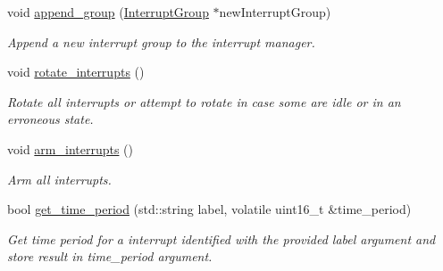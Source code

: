 \begin{DoxyCompactItemize}
\item 
void \hyperlink{classSPMB_1_1InterruptManager_a7848e944d851bf3bcc251e03e673433c}{append\+\_\+group} (\hyperlink{classSPMB_1_1InterruptGroup}{Interrupt\+Group} $\ast$new\+Interrupt\+Group)\hypertarget{classSPMB_1_1InterruptManager_a7848e944d851bf3bcc251e03e673433c}{}\label{classSPMB_1_1InterruptManager_a7848e944d851bf3bcc251e03e673433c}

\begin{DoxyCompactList}\small\item\em Append a new interrupt group to the interrupt manager. \end{DoxyCompactList}\item 
void \hyperlink{classSPMB_1_1InterruptManager_a281ff95c62f2c714024009fbdfad560e}{rotate\+\_\+interrupts} ()\hypertarget{classSPMB_1_1InterruptManager_a281ff95c62f2c714024009fbdfad560e}{}\label{classSPMB_1_1InterruptManager_a281ff95c62f2c714024009fbdfad560e}

\begin{DoxyCompactList}\small\item\em Rotate all interrupts or attempt to rotate in case some are idle or in an erroneous state. \end{DoxyCompactList}\item 
void \hyperlink{classSPMB_1_1InterruptManager_ae6d936207409563b307e3f0bbced7dbc}{arm\+\_\+interrupts} ()\hypertarget{classSPMB_1_1InterruptManager_ae6d936207409563b307e3f0bbced7dbc}{}\label{classSPMB_1_1InterruptManager_ae6d936207409563b307e3f0bbced7dbc}

\begin{DoxyCompactList}\small\item\em Arm all interrupts. \end{DoxyCompactList}\item 
bool \hyperlink{classSPMB_1_1InterruptManager_abef4d7dfc94ed70cb9b137803d75ebe4}{get\+\_\+time\+\_\+period} (std\+::string label, volatile uint16\+\_\+t \&time\+\_\+period)\hypertarget{classSPMB_1_1InterruptManager_abef4d7dfc94ed70cb9b137803d75ebe4}{}\label{classSPMB_1_1InterruptManager_abef4d7dfc94ed70cb9b137803d75ebe4}

\begin{DoxyCompactList}\small\item\em Get time period for a interrupt identified with the provided label argument and store result in time\+\_\+period argument. \end{DoxyCompactList}\end{DoxyCompactItemize}
